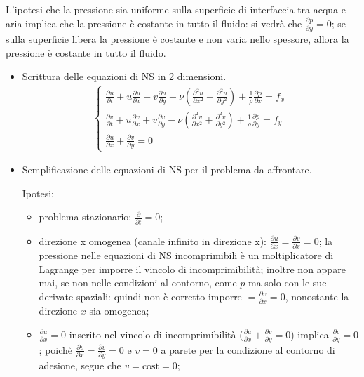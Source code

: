 \documentclass[letterpaper,10pt,italian]{jupyterBook}
\begin{document}
\sphinxAtStartPar
L’ipotesi che la pressione sia uniforme sulla superficie di interfaccia
tra acqua e aria implica che la pressione è costante in tutto il fluido:
si vedrà che \(\frac{\partial p}{\partial y}=0\); se sulla superficie
libera la pressione è costante e non varia nello spessore, allora la
pressione è costante in tutto il fluido.
\begin{itemize}
\item {} 
\sphinxAtStartPar
Scrittura delle equazioni di NS in 2 dimensioni.
\begin{equation*}
\begin{split}\begin{cases}
      \frac{\partial u}{\partial t} + u \frac{\partial u}{\partial x}
      + v \frac{\partial u}{\partial y} - \nu \left( 
      \frac{\partial^2 u}{\partial x^2} +
      \frac{\partial^2 u}{\partial y^2} \right)
       + \frac{1}{\rho} \frac{\partial p}{\partial x} = f_x \\
      \frac{\partial v}{\partial t} + u \frac{\partial v}{\partial x}
      + v \frac{\partial v}{\partial y} - \nu \left( 
      \frac{\partial^2 v}{\partial x^2} +
      \frac{\partial^2 v}{\partial y^2} \right)
      + \frac{1}{\rho}  \frac{\partial p}{\partial y} = f_y \\
      \frac{\partial u}{\partial x} + \frac{\partial v}{\partial y} = 0
    \end{cases}\end{split}
\end{equation*}
\item {} 
\sphinxAtStartPar
Semplificazione delle equazioni di NS per il problema da affrontare.

\sphinxAtStartPar
Ipotesi:
\begin{itemize}
\item {} 
\sphinxAtStartPar
problema stazionario: \(\frac{\partial}{\partial t} = 0\);

\item {} 
\sphinxAtStartPar
direzione x omogenea (canale infinito in direzione x):
\(\frac{\partial u}{\partial x} = \frac{\partial v}{\partial x} = 0\);
la pressione nelle equazioni di NS incomprimibili è un
moltiplicatore di Lagrange per imporre il vincolo di
incomprimibilità; inoltre non appare mai, se non nelle
condizioni al contorno, come \(p\) ma solo con le sue derivate
spaziali: quindi non è corretto imporre
\(= \frac{\partial v}{\partial x} = 0\), nonostante la direzione
\(x\) sia omogenea;

\item {} 
\sphinxAtStartPar
\(\frac{\partial u}{\partial x} = 0\) inserito nel vincolo di
incomprimibilità
(\(\frac{\partial u}{\partial x}+\frac{\partial v}{\partial y}=0\))
implica \(\frac{\partial v}{\partial y}=0\); poichè
\(\frac{\partial v}{\partial x}=\frac{\partial v}{\partial y}=0\)
e \(v = 0\) a parete per la condizione al contorno di adesione,
segue che \(v = \text{cost} = 0\);


\end{itemize}
\end{itemize}
\end{document}
